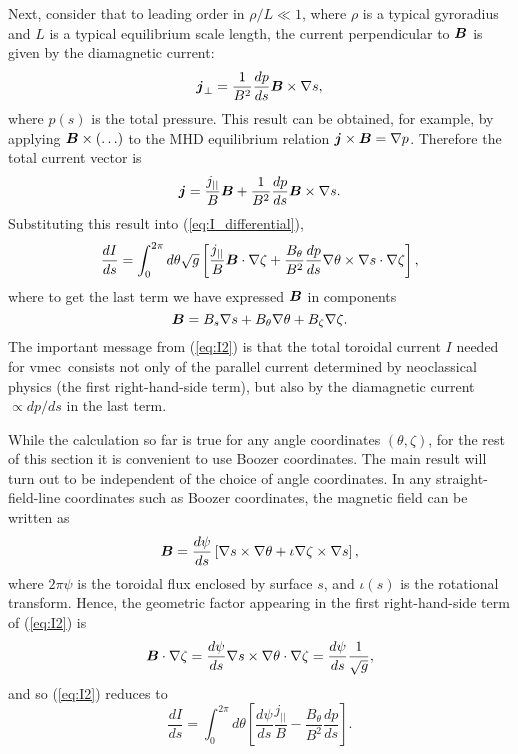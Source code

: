 \documentclass[11pt,letter]{article}
\newcommand{\vect}[1]{\mbox{\boldmath $#1$}}
\newcommand{\vmec}{{\ttfamily vmec}}
\begin{document}
Next, consider that to leading order in $\rho/L \ll 1$, where $\rho$ is a typical gyroradius and $L$ is a typical equilibrium scale length,
the current perpendicular to $\vect{B}$ is given by the diamagnetic current:
\begin{equation}
\vect{j}_\perp = \frac{1}{B^2} \frac{dp}{ds} \vect{B}\times\nabla s,
\end{equation}
where $p(s)$ is the total pressure.
This result can be obtained, for example, by applying $\vect{B}\times(\ldots)$ to the MHD equilibrium relation 
$\vect{j}\times\vect{B} = \nabla p$. Therefore the total current vector is
\begin{equation}
\vect{j} = \frac{j_{||}}{B} \vect{B} +  \frac{1}{B^2} \frac{dp}{ds} \vect{B}\times\nabla s.
\end{equation}
Substituting this result into (\ref{eq:I_differential}),
\begin{equation}
\frac{dI}{ds}=
\int_0^{2\pi}d\theta \sqrt{g} 
\left[
\frac{j_{||}}{B} \vect{B} \cdot\nabla\zeta +  \frac{B_\theta}{B^2} \frac{dp}{ds} \nabla\theta \times\nabla s\cdot\nabla\zeta
\right],
\label{eq:I2}
\end{equation}
where to get the last term we have expressed $\vect{B}$ in components
\begin{equation}
\vect{B} = B_s \nabla s + B_\theta \nabla \theta + B_\zeta \nabla\zeta.
\label{eq:B_components}
\end{equation}
The important message from (\ref{eq:I2}) is that the total toroidal current $I$ needed for \vmec~consists
 not only of the parallel current determined by neoclassical physics (the first right-hand-side term), but
also by the diamagnetic current $\propto dp/ds$ in the last term.

While the calculation so far is true for any angle coordinates $(\theta,\zeta)$,
for the rest of this section it is convenient to use Boozer coordinates.
The main result will turn out to be independent of the choice of angle coordinates.
In any straight-field-line coordinates such as Boozer coordinates, the magnetic field can be written as
\begin{equation}
\vect{B} = \frac{d\psi}{ds} \left[ \nabla s \times\nabla \theta + \iota \nabla \zeta\times\nabla s\right],
\label{eq:straight_field_lines}
\end{equation}
where $2\pi\psi$ is the toroidal flux enclosed by surface $s$, and $\iota(s)$ is the rotational transform. Hence, the geometric factor appearing
in the first right-hand-side term of (\ref{eq:I2}) is
\begin{equation}
\vect{B}\cdot\nabla\zeta =  \frac{d\psi}{ds}  \nabla s \times\nabla \theta \cdot\nabla\zeta = \frac{d\psi}{ds} \frac{1}{\sqrt{g}},
\end{equation}
and so (\ref{eq:I2}) reduces to
\begin{equation}
\frac{dI}{ds} =
 \int_0^{2\pi}d\theta 
\left[
\frac{d\psi}{ds}
\frac{j_{||}}{B}  -  \frac{B_\theta}{B^2} \frac{dp}{ds} 
\right].
\label{eq:I3}
\end{equation}
\end{document}

